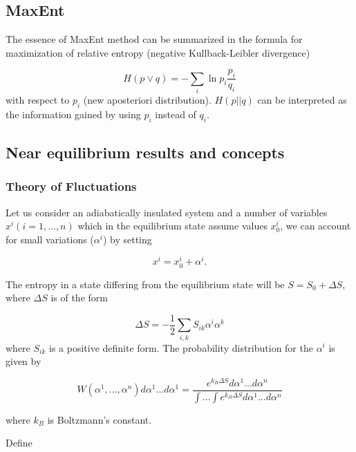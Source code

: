 \documentclass[a4paper,12pt,nofootinbib]{article}
\begin{document}
\subsection{MaxEnt}

The essence of MaxEnt method can be summarized in the formula for maximization of relative entropy (negative Kullback-Leibler divergence)

\begin{displaymath}
  H(p\lor q) = -\sum_i \ln p_i \frac{p_i}{q_i}
\end{displaymath}
with respect to $p_i$ (new aposteriori distribution). $H(p||q)$ can be interpreted as the information gained by using $p_i$ instead of $q_i$.


\subsection{Near equilibrium results and concepts}

\subsubsection{Theory of Fluctuations}

Let us consider an adiabatically insulated system and a number of variables $x^i (i=1,...,n)$ which in the equilibrium state assume values $ x_0^i $, we can account for small variations ($\alpha^i$) by setting

\begin{displaymath}
  x^i = x_0^i + \alpha^i.
\end{displaymath}

The entropy in a state differing from the equilibrium state will be $S=S_0+\Delta S$, where $\Delta S$ is of the form

\begin{displaymath}
  \Delta S = - \frac{1}{2} \sum_{i,k} S_{ik} \alpha^i \alpha^k
\end{displaymath}
where $ S_{ik} $ is a positive definite form. The probability distribution for the $\alpha^i$ is given by

\begin{displaymath}
  W(\alpha^1,...,\alpha^n)d\alpha^1 ... d\alpha^1= \frac{e^{k_B \Delta S} d\alpha^1...d\alpha^n}{\int ... \int e^{k_B \Delta S} d\alpha^1...d\alpha^n}
\end{displaymath}

where $k_B$ is Boltzmann's constant.

Define
\end{document}

